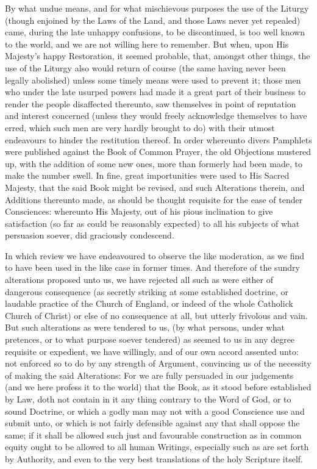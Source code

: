 By what undue means, and for what mischievous purposes the use of the Liturgy (though enjoined by the Laws of the Land, and those Laws never yet repealed) came, during the late unhappy confusions, to be discontinued, is too well known to the world, and we are not willing here to remember. But when, upon His Majesty's happy Restoration, it seemed probable, that, amongst other things, the use of the Liturgy also would return of course (the same having never been legally abolished) unless some timely means were used to prevent it; those men who under the late usurped powers had made it a great part of their business to render the people disaffected thereunto, saw themselves in point of reputation and interest concerned (unless they would freely acknowledge themselves to have erred, which such men are very hardly brought to do) with their utmost endeavours to hinder the restitution thereof. In order whereunto divers Pamphlets were published against the Book of Common Prayer, the old Objections mustered up, with the addition of some new ones, more than formerly had been made, to make the number swell. In fine, great importunities were used to His Sacred Majesty, that the said Book might be revised, and such Alterations therein, and Additions thereunto made, as should be thought requisite for the ease of tender Consciences: whereunto His Majesty, out of his pious inclination to give satisfaction (so far as could be reasonably expected) to all his subjects of what persuasion soever, did graciously condescend.

In which review we have endeavoured to observe the like moderation, as we find to have been used in the like case in former times. And therefore of the sundry alterations proposed unto us, we have rejected all such as were either of dangerous consequence (as secretly striking at some established doctrine, or laudable practice of the Church of England, or indeed of the whole Catholick Church of Christ) or else of no consequence at all, but utterly frivolous and vain. But such alterations as were tendered to us, (by what persons, under what pretences, or to what purpose soever tendered) as seemed to us in any degree requisite or expedient, we have willingly, and of our own accord assented unto: not enforced so to do by any strength of Argument, convincing us of the necessity of making the said Alterations: For we are fully persuaded in our judgements (and we here profess it to the world) that the Book, as it stood before established by Law, doth not contain in it any thing contrary to the Word of God, or to sound Doctrine, or which a godly man may not with a good Conscience use and submit unto, or which is not fairly defensible against any that shall oppose the same; if it shall be allowed such just and favourable construction as in common equity ought to be allowed to all human Writings, especially such as are set forth by Authority, and even to the very best translations of the holy Scripture itself.

